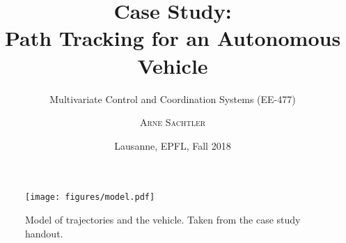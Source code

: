 \documentclass[a4paper]{scrartcl}
\title{Case Study:\\Path Tracking for an Autonomous Vehicle}
\subtitle{Multivariate Control and Coordination Systems (EE-477)}
\author{\textsc{Arne Sachtler}}
\date{Lausanne, EPFL, Fall 2018}
\begin{document}
\maketitle
\tableofcontents
\thispagestyle{empty}

\begin{figure}[h]
	\centering
	\texttt{[image: figures/model.pdf]}
	\caption{Model of trajectories and the vehicle. Taken from the case study handout.}
	\label{fig:vehicle_model}
\end{figure}

\setcounter{section}{-1}




\end{document}
